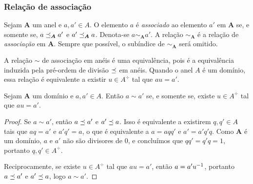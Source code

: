 
\subsubsection{Relação de associação}

\begin{definition}
Sejam $\bm A$ um anel e $a,a' \in A$. O elemento $a$ é \emph{associado} ao elemento $a'$ em $\bm A$ se, e somente se, $a \preceq_{\bm A} a'$ e $a' \preceq_{\bm A} a$. Denota-se $a \sim_{\bm A} a'$. A relação $\sim_{\bm A}$ é a relação de \emph{associação} em $\bm A$. Sempre que possível, o subíndice de $\sim_{\bm A}$ será omitido.
\end{definition}

A relação $\sim$ de associação em anéis é uma equivalência, pois é a equivalência induzida pela pré-ordem de divisão $\preceq$ em anéis. Quando o anel $A$ é um domínio, essa relação é equivalente a existir $u \in A^{\div}$ tal que $au=a'$.

\begin{proposition}
Sejam $\bm A$ um domínio e $a,a' \in A$. Então $a \sim a'$ se, e somente se, existe $u \in A^{\div}$ tal que $au=a'$.
\end{proposition}
\begin{proof}
Se $a \sim a'$, então $a \preceq a'$ e $a' \preceq a$. Isso é equivalente a existirem $q,q' \in A$ tais que $aq=a'$ e $a'q'=a$, o que é equivalente a $a=aqq'$ e $a'=a'q'q$.
Como $\bm A$ é um domínio, $a$ e $a'$ não são divisores de $0$, e concluímos que $qq'=q'q=1$, portanto $q,q' \in A^{\div}$.

Reciprocamente, se existe $u \in A^{\div}$ tal que $au=a'$, então $a=a'u^{-1}$, portanto $a \preceq a'$ e $a' \preceq a$, logo $a \sim a'$.
\end{proof}

